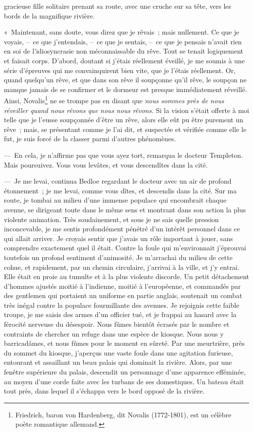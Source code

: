 \documentclass[french,twoside]{book} %
\begin{document}
gracieuse fille solitaire prenant sa route, avec une cruche sur sa tête, vers les bords de la magnifique rivière.\par
« Maintenant, sans doute, vous direz que je rêvais ; mais nullement. Ce que je voyais, – ce que j’entendais, – ce que je sentais, – ce que je pensais n’avait rien en soi de l’idiosyncrasie non méconnaissable du rêve. Tout se tenait logiquement et faisait corps. D’abord, doutant si j’étais réellement éveillé, je me soumis à une série d’épreuves qui me convainquirent bien vite, que je l’étais réellement. Or, quand quelqu’un rêve, et que dans son rêve il soupçonne qu’il rêve, le soupçon ne manque jamais de se confirmer et le dormeur est presque immédiatement réveillé. Ainsi, Novalis\footnote{Friedrich, baron von Hardenberg, dit Novalis (1772-1801), est un célèbre poète romantique allemand.} ne se trompe pas en disant que \emph{nous sommes près de nous réveiller quand nous rêvons que nous nous rêvons.} Si la vision s’était offerte à moi telle que je l’eusse soupçonnée d’être un rêve, alors elle eût pu être purement un rêve ; mais, se présentant comme je l’ai dit, et suspectée et vérifiée comme elle le fut, je suis forcé de la classer parmi d’autres phénomènes.\par
— En cela, je n’affirme pas que vous ayez tort, remarqua le docteur Templeton. Mais poursuivez. Vous vous levâtes, et vous descendîtes dans la cité.\par
— Je me levai, continua Bedloe regardant le docteur avec un air de profond étonnement ; je me levai, comme vous dîtes, et descendis dans la cité. Sur ma route, je tombai au milieu d’une immense populace qui encombrait chaque avenue, se dirigeant toute dans le même sens et montrant dans son action la plus violente animation. Très soudainement, et sous je ne sais quelle pression inconcevable, je me sentis profondément pénétré d’un intérêt personnel dans ce qui allait arriver. Je croyais sentir que j’avais un rôle important à jouer, sans comprendre exactement quel il était. Contre la foule qui m’environnait j’éprouvai toutefois un profond sentiment d’animosité. Je m’arrachai du milieu de cette cohue, et rapidement, par un chemin circulaire, j’arrivai à la ville, et j’y entrai. Elle était en proie au tumulte et à la plus violente discorde. Un petit détachement d’hommes ajustés moitié à l’indienne, moitié à l’européenne, et commandés par des gentlemen qui portaient un uniforme en partie anglais, soutenait un combat très inégal contre la populace fourmillante des avenues. Je rejoignis cette faible troupe, je me saisis des armes d’un officier tué, et je frappai au hasard avec la férocité nerveuse du désespoir. Nous fûmes bientôt écrasés par le nombre et contraints de chercher un refuge dans une espèce de kiosque. Nous nous y barricadâmes, et nous fûmes pour le moment en sûreté. Par une meurtrière, près du sommet du kiosque, j’aperçus une vaste foule dans une agitation furieuse, entourant et assaillant un beau palais qui dominait la rivière. Alors, par une fenêtre supérieure du palais, descendit un personnage d’une apparence efféminée, au moyen d’une corde faite avec les turbans de ses domestiques. Un bateau était tout près, dans lequel il s’échappa vers le bord opposé de la rivière.\par
\end{document}

